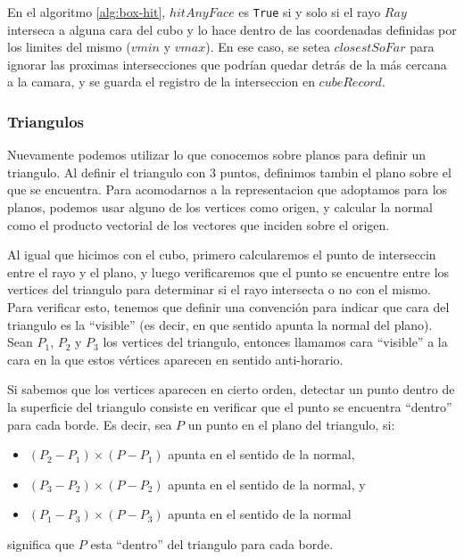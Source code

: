 En el algoritmo \ref{alg:box-hit}, $hitAnyFace$ es \texttt{True} si y solo si el
rayo $Ray$ interseca a alguna cara del cubo y lo hace dentro de las coordenadas
definidas por los limites del mismo ($vmin$ y $vmax$). En ese caso, se setea
$closestSoFar$ para ignorar las proximas intersecciones que podrían quedar detrás
de la más cercana a la camara, y se guarda el registro de la interseccion en
$cubeRecord$.

\subsubsection{Triangulos}

Nuevamente podemos utilizar lo que conocemos sobre planos para definir un
triangulo. Al definir el triangulo con 3 puntos, definimos tambin el plano sobre
el que se encuentra. Para acomodarnos a la representacion que adoptamos para los
planos, podemos usar alguno de los vertices como origen, y calcular la normal
como el producto vectorial de los vectores que inciden sobre el origen.


Al igual que hicimos con el cubo, primero calcularemos el punto de interseccin
entre el rayo y el plano, y luego verificaremos que el punto se encuentre entre
los vertices del triangulo para determinar si el rayo intersecta o no con el
mismo. Para verificar esto, tenemos que definir una convención para indicar que
cara del triangulo es la ``visible'' (es decir, en que sentido apunta la normal
del plano). Sean $P_1$, $P_2$ y $P_3$ los vertices del triangulo, entonces llamamos
cara ``visible'' a la cara en la que estos vértices aparecen en sentido anti-horario.

Si sabemos que los vertices aparecen en cierto orden, detectar un punto dentro de
la superficie del triangulo consiste en verificar que el punto se encuentra ``dentro''
para cada borde. Es decir, sea $P$ un punto en el plano del triangulo, si:

\begin{itemize}
    \item $(P_2 - P_1) \times (P - P_1)$ apunta en el sentido de la normal,
    \item $(P_3 - P_2) \times (P - P_2)$ apunta en el sentido de la normal, y
    \item $(P_1 - P_3) \times (P - P_3)$ apunta en el sentido de la normal
\end{itemize}

significa que $P$ esta ``dentro'' del triangulo para cada borde.

